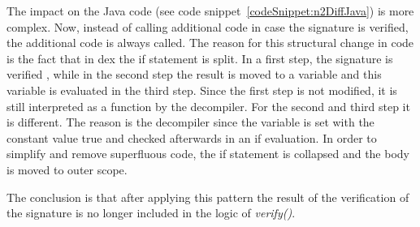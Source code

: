 The impact on the Java code (see code snippet~\ref{codeSnippet:n2DiffJava}) is more complex.
Now, instead of calling additional code in case the signature is verified, the additional code is always called.
The reason for this structural change in code is the fact that in dex the if statement is split.
In a first step, the signature is verified , while in the second step the result is moved to a variable and this variable is evaluated in the third step.
Since the first step is not modified, it is still interpreted as a function by the decompiler.
For the second and third step it is different.
The reason is the decompiler since the variable is set with the constant value true and checked afterwards in an if evaluation.
In order to simplify and remove superfluous code, the if statement is collapsed and the body is moved to outer scope.
\newline


The conclusion is that after applying this pattern the result of the verification of the signature is no longer included in the logic of \textit{verify()}.

